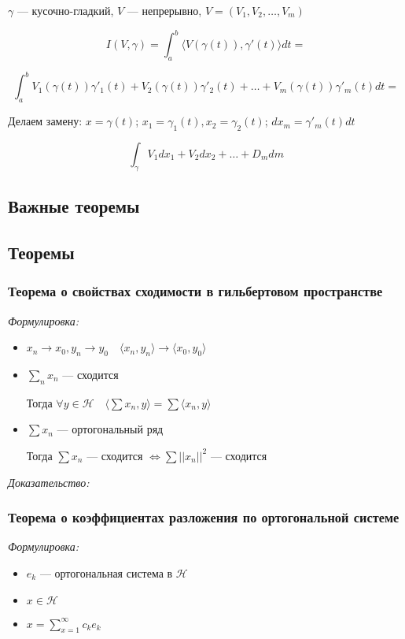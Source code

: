 \documentclass{article}
\begin{document}
$\gamma$ --- кусочно-гладкий, $V$ --- непрерывно, $V = (V_1, V_2, \ldots, V_m)$

\[I(V, \gamma) = \int_a^b\langle V\left(\gamma(t)\right), \gamma'(t)\rangle dt = \]

\[\int_a^b V_1\left(\gamma(t)\right)\gamma'_1(t) + V_2\left(\gamma(t)\right)\gamma'_2(t) + \ldots + V_m\left(\gamma(t)\right)\gamma'_m(t) dt =\]

Делаем замену: $x = \gamma(t)$; $x_1 = \gamma_1(t), x_2 = \gamma_2(t)$; $dx_m = \gamma'_m(t) dt$

\[\int_{\gamma} V_1 dx_1 + V_2 dx_2 + \ldots + D_m dm\]

\newpage

\subsection{Важные теоремы}
\newpage

\subsection{Теоремы}
\subsubsection{Теорема о свойствах сходимости в гильбертовом пространстве}
\textit{Формулировка:}

\begin{itemize}
    \item $x_n \rightarrow x_0, y_n \rightarrow y_0 \quad \langle x_n, y_n \rangle \rightarrow \langle x_0, y_0 \rangle$
    \item $\sum_n x_n$ --- сходится
    
    Тогда $\forall y \in \mathcal{H} \quad \langle \sum x_n , y\rangle = \sum \langle x_n, y \rangle$

    \item $\sum x_n$ --- ортогональный ряд
    
    Тогда $\sum x_n$ --- сходится $\Leftrightarrow \sum ||x_n||^2$ --- сходится
\end{itemize}

\textit{Доказательство:}

\subsubsection{Теорема о коэффициентах разложения по ортогональной системе}
\textit{Формулировка:}

\begin{itemize}
    \item ${e_k}$ --- ортогональная система в $\mathcal{H}$
    \item $x \in \mathcal{H}$
    \item $x = \sum_{x = 1}^{\infty} c_k e_k$
\end{itemize}
\end{document}
